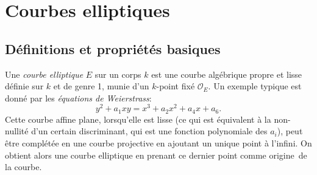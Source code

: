 \documentclass[11pt,a4paper]{article}
\renewcommand{\O}{\mathcal{O}}
\theoremstyle{definition}
\begin{document}
\section{Courbes elliptiques}


\subsection{Définitions et propriétés basiques}


Une \emph{courbe elliptique} $E$ sur un corps $k$ est une courbe algébrique propre et lisse définie sur $k$ et de genre 1, munie d'un $k$-point fixé $\O_E$. Un exemple typique est donné par les \emph{équations de Weierstrass}:
$$y^2 + a_1xy = x^3 + a_2x^2 + a_4 x + a_6.$$
Cette courbe affine plane, lorsqu'elle est lisse (ce qui est équivalent à la non-nullité d'un certain discriminant, qui est une fonction polynomiale des $a_i$), peut être complétée en une courbe projective en ajoutant un unique point à l'infini. On obtient alors une courbe elliptique en prenant ce dernier point comme \og origine\fg\ de la courbe.
\end{document}
